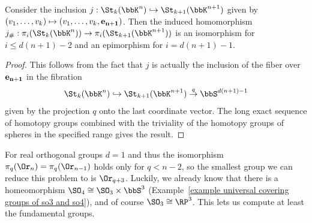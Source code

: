 \begin{cor}
    Consider the inclusion $j:\St_k(\bbK^n)\hookrightarrow \St_{k+1}(\bbK^{n+1})$ given by $(v_1,\ldots,v_k)\mapsto (v_1,\ldots,v_k,\bf{e}_{n+1})$.
    Then the induced homomorphism $j_\#:\pi_i(\St_k(\bbK^n))\to \pi_i(\St_{k+1}(\bbK^{n+1}))$ is an isomorphism for $i\leq d(n+1)-2$ and an epimorphism for $i=d(n+1)-1$.
\end{cor}
\begin{proof}
    This follows from the fact that $j$ is actually the inclusion of the fiber over $\bf{e}_{n+1}$ in the fibration
    \[\St_k(\bbK^n)\hookrightarrow \St_{k+1}(\bbK^{n+1})\overset{q}{\to} \bbS^{d(n+1)-1}\]
    given by the projection $q$ onto the last coordinate vector. The long exact sequence of homotopy groups combined with the triviality of the homotopy groups of spheres in the specified range gives the result.
\end{proof}

For real orthogonal groups $d=1$ and thus the isomorphism $\pi_q(\Or_n)=\pi_q(\Or_{n-1})$ holds only for $q<n-2$, so the smallest group we can reduce this problem to is $\Or_{q+3}$. Luckily, we already know that there is a homeomorphism $\SO_4\cong \SO_3\times \bbS^3$ (Example~\ref{example universal covering groups of so3 and so4}), and of course $\SO_3\cong \RP^3$. This lets us compute at least the fundamental groups.

